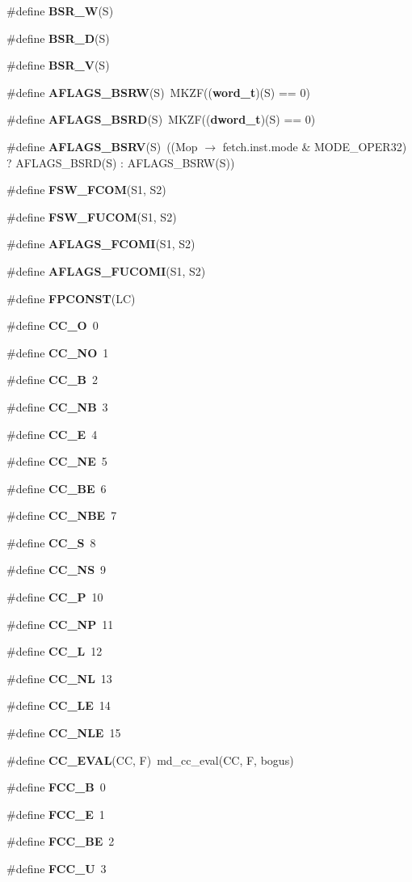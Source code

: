 \begin{CompactItemize}
\#define {\bf BSR\_\-W}(S)
\item 
\#define {\bf BSR\_\-D}(S)
\item 
\#define {\bf BSR\_\-V}(S)
\item 
\#define {\bf AFLAGS\_\-BSRW}(S)~MKZF(({\bf word\_\-t})(S) == 0)
\item 
\#define {\bf AFLAGS\_\-BSRD}(S)~MKZF(({\bf dword\_\-t})(S) == 0)
\item 
\#define {\bf AFLAGS\_\-BSRV}(S)~((Mop $\rightarrow$ fetch.inst.mode \& MODE\_\-OPER32) ? AFLAGS\_\-BSRD(S) : AFLAGS\_\-BSRW(S))
\item 
\#define {\bf FSW\_\-FCOM}(S1, S2)
\item 
\#define {\bf FSW\_\-FUCOM}(S1, S2)
\item 
\#define {\bf AFLAGS\_\-FCOMI}(S1, S2)
\item 
\#define {\bf AFLAGS\_\-FUCOMI}(S1, S2)
\item 
\#define {\bf FPCONST}(LC)
\item 
\#define {\bf CC\_\-O}~0
\item 
\#define {\bf CC\_\-NO}~1
\item 
\#define {\bf CC\_\-B}~2
\item 
\#define {\bf CC\_\-NB}~3
\item 
\#define {\bf CC\_\-E}~4
\item 
\#define {\bf CC\_\-NE}~5
\item 
\#define {\bf CC\_\-BE}~6
\item 
\#define {\bf CC\_\-NBE}~7
\item 
\#define {\bf CC\_\-S}~8
\item 
\#define {\bf CC\_\-NS}~9
\item 
\#define {\bf CC\_\-P}~10
\item 
\#define {\bf CC\_\-NP}~11
\item 
\#define {\bf CC\_\-L}~12
\item 
\#define {\bf CC\_\-NL}~13
\item 
\#define {\bf CC\_\-LE}~14
\item 
\#define {\bf CC\_\-NLE}~15
\item 
\#define {\bf CC\_\-EVAL}(CC, F)~md\_\-cc\_\-eval(CC, F, bogus)
\item 
\#define {\bf FCC\_\-B}~0
\item 
\#define {\bf FCC\_\-E}~1
\item 
\#define {\bf FCC\_\-BE}~2
\item 
\#define {\bf FCC\_\-U}~3
\item 

\end{CompactItemize}
